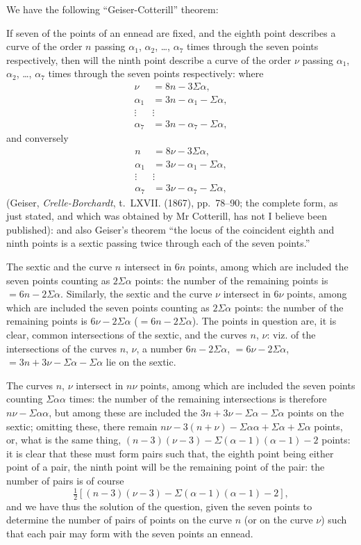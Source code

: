 \documentclass[11pt,a4paper]{article}
\theoremstyle{plain}
\theoremstyle{definition}
\theoremstyle{remark}
\begin{document}
We have the following ``Geiser-Cotterill'' theorem:

If seven of the points of an ennead are fixed, and the eighth point describes a curve of the order $n$ passing $\alpha_1$, $\alpha_2$, \ldots, $\alpha_7$ times through the seven points respectively, then will the ninth point describe a curve of the order $\nu$ passing $\alpha_1$, $\alpha_2$, \ldots, $\alpha_7$ times through the seven points respectively: where
\begin{align*}
\nu &= 8n - 3\Sigma\alpha,\\
\alpha_1 &= 3n - \alpha_1 - \Sigma\alpha,\\
\vdots\ &\vdots\\
\alpha_7 &= 3n - \alpha_7 - \Sigma\alpha,
\end{align*}
and conversely
\begin{align*}
n &= 8\nu - 3\Sigma\alpha,\\
\alpha_1 &= 3\nu - \alpha_1 - \Sigma\alpha,\\
\vdots\ &\vdots\\
\alpha_7 &= 3\nu - \alpha_7 - \Sigma\alpha,
\end{align*}
(Geiser, \textit{Crelle-Borchardt}, t.~LXVII. (1867), pp.~78--90; the complete form, as just stated, and which was obtained by Mr Cotterill, has not I believe been published): and also Geiser's theorem ``the locus of the coincident eighth and ninth points is a sextic passing twice through each of the seven points.''

The sextic and the curve $n$ intersect in $6n$ points, among which are included the seven points counting as $2\Sigma\alpha$ points: the number of the remaining points is $= 6n - 2\Sigma\alpha$. Similarly, the sextic and the curve $\nu$ intersect in $6\nu$ points, among which are included the seven points counting as $2\Sigma\alpha$ points: the number of the remaining points is $6\nu - 2\Sigma\alpha$ ($= 6n - 2\Sigma\alpha$). The points in question are, it is clear, common intersections of the sextic, and the curves $n$, $\nu$: viz. of the intersections of the curves $n$, $\nu$, a number $6n - 2\Sigma\alpha$, $= 6\nu - 2\Sigma\alpha$, $= 3n + 3\nu - \Sigma\alpha - \Sigma\alpha$ lie on the sextic.

The curves $n$, $\nu$ intersect in $n\nu$ points, among which are included the seven points counting $\Sigma\alpha\alpha$ times: the number of the remaining intersections is therefore $n\nu - \Sigma\alpha\alpha$, but among these are included the $3n + 3\nu - \Sigma\alpha - \Sigma\alpha$ points on the sextic; omitting these, there remain $n\nu - 3(n + \nu) - \Sigma\alpha\alpha + \Sigma\alpha + \Sigma\alpha$ points, or, what is the same thing, $(n-3)(\nu-3) - \Sigma(\alpha-1)(\alpha-1) - 2$ points: it is clear that these must form pairs such that, the eighth point being either point of a pair, the ninth point will be the remaining point of the pair: the number of pairs is of course
\[
\tfrac{1}{2}[(n-3)(\nu-3) - \Sigma(\alpha-1)(\alpha-1) - 2],
\]
and we have thus the solution of the question, given the seven points to determine the number of pairs of points on the curve $n$ (or on the curve $\nu$) such that each pair may form with the seven points an ennead.
\end{document}
